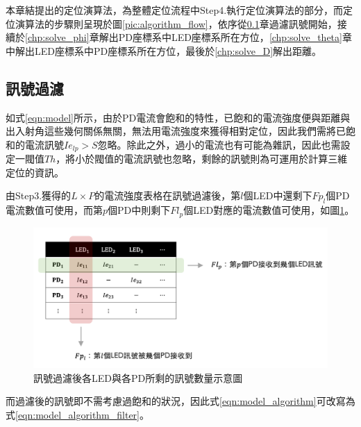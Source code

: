 本章結提出的定位演算法，為整體定位流程中Step4.執行定位演算法的部分，而定位演算法的步驟則呈現於圖\ref{pic:algorithm_flow}，依序從\ref{chp:algorithm_filter}章過濾訊號開始，接續於\ref{chp:solve_phi}章解出PD座標系中LED座標系所在方位，\ref{chp:solve_theta}章中解出LED座標系中PD座標系所在方位，最後於\ref{chp:solve_D}解出距離。



    \subsection{訊號過濾}
    \label{chp:algorithm_filter}

    如式\ref{eqn:model}所示，由於PD電流會飽和的特性，已飽和的電流強度便與距離與出入射角這些幾何關係無關，無法用電流強度來獲得相對定位，因此我們需將已飽和的電流訊號$Ie_{lp}>S$忽略。除此之外，過小的電流也有可能為雜訊，因此也需設定一閥值$Th$，將小於閥值的電流訊號也忽略，剩餘的訊號則為可運用於計算三維定位的資訊。
    
    由Step3.獲得的$L\times P$的電流強度表格在訊號過濾後，第$l$個LED中還剩下$Fp_l$個PD電流數值可使用，而第$p$個PD中則剩下$Fl_p$個LED對應的電流數值可使用，如圖\ref{pic:after_filter}。

    \begin{figure}[htpb]
        \centering
        \includegraphics[width=15cm]{ch3pic/after_filter.png}
        \caption{訊號過濾後各LED與各PD所剩的訊號數量示意圖}
        \label{pic:after_filter}
    \end{figure}

    而過濾後的訊號即不需考慮過飽和的狀況，因此式\ref{eqn:model_algorithm}可改寫為式\ref{eqn:model_algorithm_filter}。

